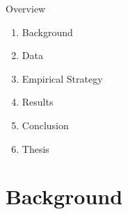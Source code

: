 \documentclass[10pt]{beamer}
\begin{document}
\begin{frame}
	{Overview}
	\begin{enumerate}
		\item Background
		\item Data
		\item Empirical Strategy
		\item Results
		\item Conclusion
		\item Thesis
	\end{enumerate}
\end{frame}
\section{Background}
\end{document}
